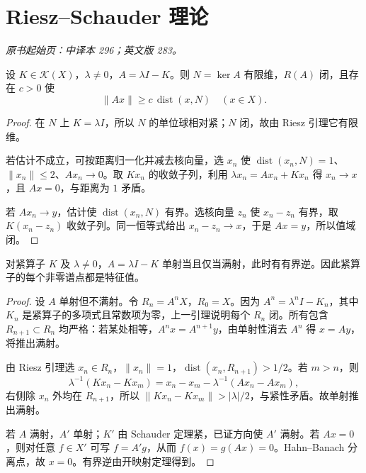 \section{Riesz--Schauder 理论}\label{sec:yosida-10-05}
\noindent\textit{原书起始页：中译本 296；英文版 283。}

\begin{lemma}[闭值域与商空间估计]\label{lem:y10-closed-range}
设 $K\in\mathcal K(X)$，$\lambda\ne0$，$A=\lambda I-K$。则 $N=\ker A$ 有限维，$R(A)$ 闭，且存在 $c>0$ 使
\[
 \|Ax\|\ge c\,\operatorname{dist}(x,N)\quad(x\in X).
\]
\end{lemma}
\begin{proof}
在 $N$ 上 $K=\lambda I$，所以 $N$ 的单位球相对紧；$N$ 闭，故由 Riesz 引理它有限维。

若估计不成立，可按距离归一化并减去核向量，选 $x_n$ 使 $\operatorname{dist}(x_n,N)=1$、$\|x_n\|\le2$、$Ax_n\to0$。取 $Kx_n$ 的收敛子列，利用 $\lambda x_n=Ax_n+Kx_n$ 得 $x_n\to x$，且 $Ax=0$，与距离为 $1$ 矛盾。

若 $Ax_n\to y$，估计使 $\operatorname{dist}(x_n,N)$ 有界。选核向量 $z_n$ 使 $x_n-z_n$ 有界，取 $K(x_n-z_n)$ 收敛子列。同一恒等式给出 $x_n-z_n\to x$，于是 $Ax=y$，所以值域闭。
\end{proof}

\begin{theorem}\label{thm:y10-alternative}
对紧算子 $K$ 及 $\lambda\ne0$，$A=\lambda I-K$ 单射当且仅当满射，此时有有界逆。因此紧算子的每个非零谱点都是特征值。
\end{theorem}
\begin{proof}
设 $A$ 单射但不满射。令 $R_n=A^nX$，$R_0=X$。因为 $A^n=\lambda^nI-K_n$，其中 $K_n$ 是紧算子的多项式且常数项为零，上一引理说明每个 $R_n$ 闭。所有包含 $R_{n+1}\subset R_n$ 均严格：若某处相等，$A^nx=A^{n+1}y$，由单射性消去 $A^n$ 得 $x=Ay$，将推出满射。

由 Riesz 引理选 $x_n\in R_n$，$\|x_n\|=1$，$\operatorname{dist}(x_n,R_{n+1})>1/2$。若 $m>n$，则
\[
 \lambda^{-1}(Kx_n-Kx_m)=x_n-x_m-\lambda^{-1}(Ax_n-Ax_m),
\]
右侧除 $x_n$ 外均在 $R_{n+1}$，所以 $\|Kx_n-Kx_m\|>|\lambda|/2$，与紧性矛盾。故单射推出满射。

若 $A$ 满射，$A'$ 单射；$K'$ 由 Schauder 定理紧，已证方向使 $A'$ 满射。若 $Ax=0$，则对任意 $f\in X'$ 可写 $f=A'g$，从而 $f(x)=g(Ax)=0$。Hahn--Banach 分离点，故 $x=0$。有界逆由开映射定理得到。
\end{proof}

